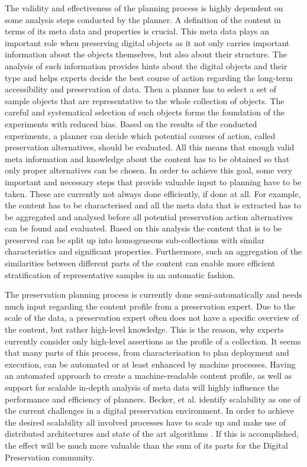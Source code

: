 The validity and effectiveness of the planning process is highly dependent on some analysis steps conducted by the planner.
A definition of the content in terms of its meta data and properties is crucial.
This meta data plays an important role when preserving digital objects as it not only carries important information about the objects themselves, but also about their structure.
The analysis of such information provides hints about the digital objects and their type and helps experts decide the best course of action regarding the long-term accessibility and preservation of data.
Then a planner has to select a set of sample objects that are representative to the whole collection of objects.
The careful and systematical selection of such objects forms the foundation of the experiments with reduced bias.
Based on the results of the conducted experiments, a planner can decide which potential courses of action, called preservation alternatives, should be evaluated.
All this means that enough valid meta information and knowledge about the content has to be obtained so that only proper alternatives can be chosen.
In order to achieve this goal, some very important and necessary steps that provide valuable input to planning have to be taken.
These are currently not always done efficiently, if done at all. 
For example, the content has to be characterised and all the meta data that is extracted has to be aggregated and analysed before all potential preservation action alternatives can be found and evaluated.
Based on this analysis the content that is to be preserved can be split up into homogeneous sub-collections with similar characteristics and significant properties.
Furthermore, such an aggregation of the similarities between different parts of the content can enable more efficient stratification of representative samples in an automatic fashion.

The preservation planning process is currently done semi-automatically and needs much input regarding the content profile from a preservation expert.
Due to the scale of the data, a preservation expert often does not have a specific overview of the content, but rather high-level knowledge. This is the reason, why experts currently consider only high-level assertions as the profile of a collection.
It seems that many parts of this process, from characterisation to plan deployment and execution, can be automated or at least enhanced by machine processes.
Having an automated approach to create a machine-readable content profile, as well as support for scalable in-depth analysis of meta data will highly influence the performance and efficiency of planners.
Becker, et al. identify scalability as one of the current challenges in a digital preservation environment. In order to achieve the desired scalability all involved processes have to scale up and make use of distributed architectures and state of the art algorithms \cite{Becker:2011:PDT:1998076.1998089}. If this is accomplished, the effect will be much more valuable than the sum of its parts for the Digital Preservation community.

